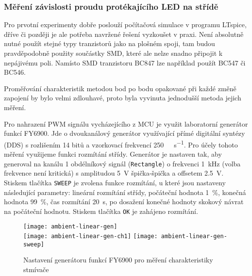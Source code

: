 \subsubsection{Měření závislosti proudu protékajícího LED na střídě}
Pro prvotní experimenty dobře poslouží počítačová simulace v programu
LTspice, dříve či později je ale potřeba navržené řešení vyzkoušet v praxi.
Není absolutně nutné použít stejné typy tranzistorů jako na plošném spoji, tam
budou pravděpodobně použity součástky SMD, které ale nelze snadno připojit
k nepájivému poli. Namísto SMD tranzistoru BC847 lze například použít BC547 či
BC546.

Proměřování charakteristik metodou bod po bodu opakované při každé změně
zapojení by bylo velmi zdlouhavé, proto byla vyvinuta jednodušší metoda jejich
měření.

Pro nahrazení PWM signálu vycházejícího z \acs{MCU} je využit laboratorní
generátor funkcí FY6900. Jde o dvoukanálový generátor využívající přímé
digitální syntézy (DDS) s rozlišením 14 bitů a vzorkovací frekvencí
\SI{250}{\mega\sample\per\second}. Pro účely tohoto měření využijeme funkci
rozmítání střídy. Generátor je nastaven tak, aby generoval na kanálu 1
obdélníkový signál (\texttt{Rectangle}) o frekvenci \SI{1}{\kilo\hertz} (volba
frekvence není kritická) s amplitudou \SI{5}{\volt} špička-špička a offsetem
\SI{2,5}{\volt}. Stiskem tlačítka \texttt{SWEEP} je zvolena funkce rozmítání,
u které jsou nastaveny následující parametry: lineární rozmítání střídy,
počáteční hodnota \SI{1}{\percent}, konečná hodnota \SI{99}{\percent}, čas
rozmítání \SI{20}{\second}, po dosažení konečné hodnoty skokový návrat na
počáteční hodnotu.
Stiskem tlačítka \texttt{OK} je zahájeno rozmítání.

\begin{figure}[htb]
    \centering
    \texttt{[image: ambient-linear-gen]}
    \\ \vspace{5mm}
    \texttt{[image: ambient-linear-gen-ch1]}
    \hfill
    \texttt{[image: ambient-linear-gen-sweep]}
    \caption{%
        Nastavení generátoru funkcí FY6900 pro měření charakteristiky stmívače
    }
    \label{fig:ambient linear mereni generator}
\end{figure}

